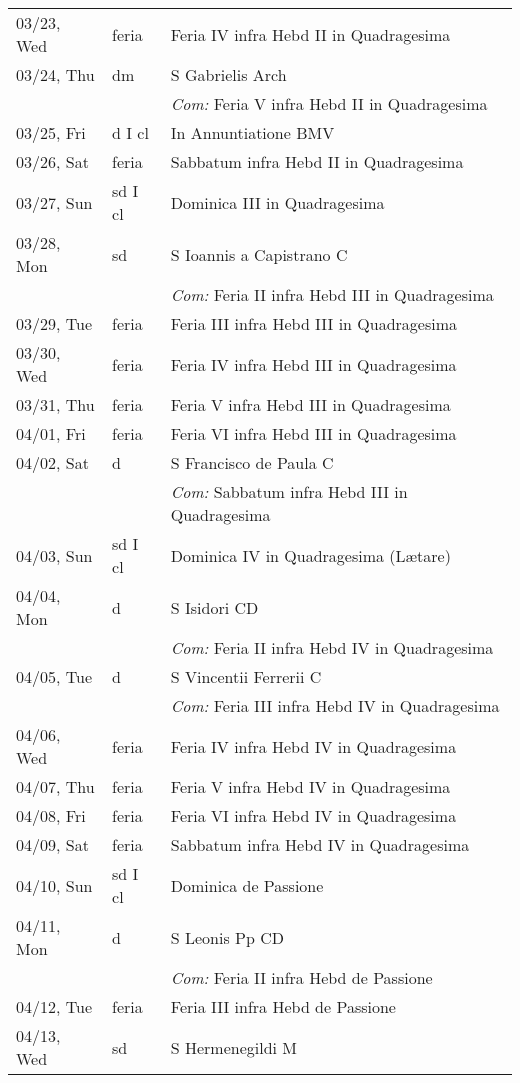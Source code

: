 \documentclass[10pt]{article}
\begin{document}
\begin{longtable}{ l l l }
03/23, Wed & feria & Feria IV infra Hebd II in Quadragesima\\
03/24, Thu & dm & S Gabrielis Arch\\
 & & \textit{Com:} Feria V infra Hebd II in Quadragesima\\
03/25, Fri & d I cl & In Annuntiatione BMV\\
03/26, Sat & feria & Sabbatum infra Hebd II in Quadragesima\\
03/27, Sun & sd I cl & Dominica III in Quadragesima\\
03/28, Mon & sd & S Ioannis a Capistrano C\\
 & & \textit{Com:} Feria II infra Hebd III in Quadragesima\\
03/29, Tue & feria & Feria III infra Hebd III in Quadragesima\\
03/30, Wed & feria & Feria IV infra Hebd III in Quadragesima\\
03/31, Thu & feria & Feria V infra Hebd III in Quadragesima\\
04/01, Fri & feria & Feria VI infra Hebd III in Quadragesima\\
04/02, Sat & d & S Francisco de Paula C\\
 & & \textit{Com:} Sabbatum infra Hebd III in Quadragesima\\
04/03, Sun & sd I cl & Dominica IV in Quadragesima (Lætare)\\
04/04, Mon & d & S Isidori CD\\
 & & \textit{Com:} Feria II infra Hebd IV in Quadragesima \\
04/05, Tue & d & S Vincentii Ferrerii C\\
 & & \textit{Com:} Feria III infra Hebd IV in Quadragesima \\
04/06, Wed & feria & Feria IV infra Hebd IV in Quadragesima \\
04/07, Thu & feria & Feria V infra Hebd IV in Quadragesima \\
04/08, Fri & feria & Feria VI infra Hebd IV in Quadragesima \\
04/09, Sat & feria & Sabbatum infra Hebd IV in Quadragesima \\
04/10, Sun & sd I cl & Dominica de Passione\\
04/11, Mon & d & S Leonis Pp CD\\
 & & \textit{Com:} Feria II infra Hebd de Passione\\
04/12, Tue & feria & Feria III infra Hebd de Passione\\
04/13, Wed & sd & S Hermenegildi M\\

\end{longtable}
\end{document}
